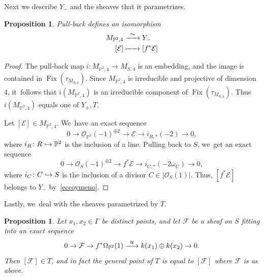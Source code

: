 \documentclass[11pt]{article}
\newcommand\hto{\mathrel{\lhook\joinrel\to}}
\newcommand\To[1]{\mathchoice{\xrightarrow{\textstyle\kern4pt#1\kern3pt}}{\stackrel{#1}{\longrightarrow}}{}{}}
\newcommand\Mto[1]{\mathrel{\mapstochar\To{#1}}}
\newcommand{\PP}{{\mathbb P}}\let\P\PP
\newcommand\cE{\mathcal{E}}
\newcommand\cF{\mathcal{F}}
\newcommand\cO{\mathcal{O}}
\DeclareMathOperator{\Fix}{Fix}
\let\hra\hto
\newtheorem{prop}[lemm]{Proposition}
\theoremstyle{definition}
\begin{document}
Next we describe $Y_-$ and the sheaves that it parametrizes.

\begin{prop}\label{prop:ypsilonmeno}
Pull-back defines an isomorphism
\begin{equation*}
\begin{aligned}
M_{\PP^2,4} & \To{\sim} Y_{-}\\
[\cE] & \Mto{\hphantom{\sim}}  [f^{*}\cE]
\end{aligned}
\end{equation*}
\end{prop}

\begin{proof}
The pull-back map $i\colon M_{\PP^2,4}\to M_{S,4}$ is an embedding, and the image is contained in $\Fix(\tau_{M_{S,4}})$. Since $M_{\PP^2,4}$ is irreducible and projective of dimension $4$, it~follows that $i(M_{\PP^2,4})$ is an irreducible component of $\Fix(\tau_{M_{S,4}})$. Thus $i(M_{\PP^2,4})$ equals one of $Y_{\pm},T$.

Let $[\cE]\in M_{\PP^2,4}$. We~have an exact sequence
\begin{equation*}
0\to \cO_{\PP^2}(-1)^{\oplus 2}\to \cE\to i_{R,*}(-2)\to 0,
\end{equation*}
where $i_R\colon R\hra\PP^2$ is the inclusion of a line. Pulling back to $S$, we~get
an exact sequence
\begin{equation*}
0\to \cO_{S}(-1)^{\oplus 2}\to f^{*}\cE\to i_{C,*}(-2\omega_C)\to 0,
\end{equation*}
where $i_C\colon C\hra S $ is the inclusion of a divisor $C\in|\cO_S(1)|$. Thus, $[f^{*}\cE]$ belongs to $Y_{-}$ by~\eqref{eccoymeno}.
\end{proof}

Lastly, we~deal with the sheaves parametrized by $T$.

\begin{prop}\label{prop:eccoti}
Let $x_1,x_2\in{\mathsf\Gamma}$ be distinct points, and let $\cF$ be a sheaf on $S$
fitting into an exact sequence
\begin{equation}\label{eccoeffe}
0\to \cF \to f^*\Omega_{\P^2}(1) \To{u} k(x_1)\oplus k(x_2)\to 0.
\end{equation}
Then $[\cF]\in T$, and in fact the general point of $T$ is equal to $[\cF]$ where $\cF$ is as above.
\end{prop}
\end{document}
